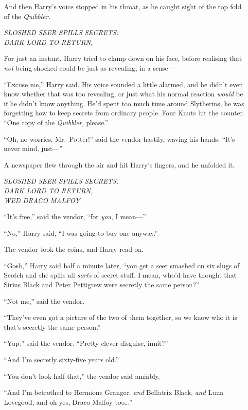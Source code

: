 And then Harry's voice stopped in his throat, as he caught sight of the
top fold of the \emph{Quibbler.}

\emph{SLOSHED SEER SPILLS SECRETS:}\\\emph{DARK LORD TO RETURN,}

For just an instant, Harry tried to clamp down on his face, before
realising that \emph{not} being shocked could be just as revealing, in a
sense---

``Excuse me,'' Harry said. His voice sounded a little alarmed, and he
didn't even know whether that was too revealing, or just what his normal
reaction \emph{would} be if he didn't know anything. He'd spent too much
time around Slytherins, he was forgetting how to keep secrets from
ordinary people. Four Knuts hit the counter. ``One copy of the
\emph{Quibbler,} please.''

``Oh, no worries, Mr.~Potter!'' said the vendor hastily, waving his
hands. ``It's---never mind, just---''

A newspaper flew through the air and hit Harry's fingers, and he
unfolded it.

\emph{SLOSHED SEER SPILLS SECRETS:}\\\emph{DARK LORD TO
RETURN,}\\\emph{WED DRACO MALFOY}

``It's free,'' said the vendor, ``for \emph{you}, I mean---''

``No,'' Harry said, ``I was going to buy one anyway.''

The vendor took the coins, and Harry read on.

``Gosh,'' Harry said half a minute later, ``you get a seer smashed on
six slugs of Scotch and she spills all \emph{sorts} of secret stuff. I
mean, who'd have thought that Sirius Black and Peter Pettigrew were
secretly the same person?''

``Not me,'' said the vendor.

``They've even got a picture of the two of them together, so we know who
it is that's secretly the same person.''

``Yup,'' said the vendor. ``Pretty clever disguise, innit?''

``And I'm secretly sixty-five years old.''

``You don't look half that,'' the vendor said amiably.

``And I'm betrothed to Hermione Granger, \emph{and} Bellatrix Black,
\emph{and} Luna Lovegood, and oh yes, Draco Malfoy too\ldots{}''

